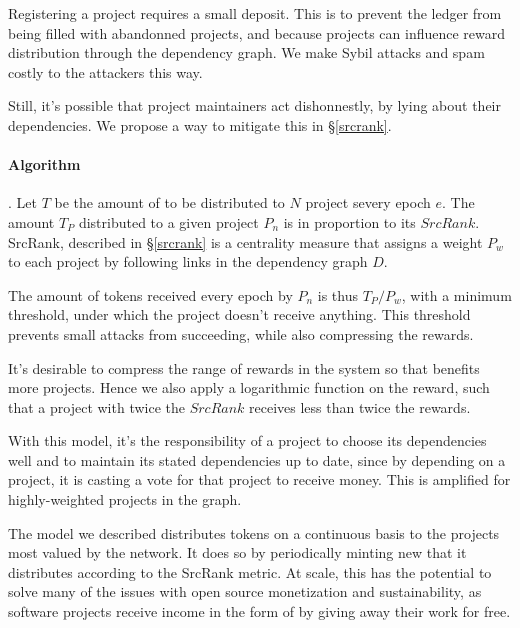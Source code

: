Registering a project requires a small deposit. This is to prevent the ledger
from being filled with abandonned projects, and because projects can influence
reward distribution through the dependency graph. We make Sybil attacks and
spam costly to the attackers this way.

Still, it's possible that project maintainers act dishonnestly, by lying about
their dependencies. We propose a way to mitigate this in \S \ref{srcrank}.

\paragraph{Algorithm}. Let $T$ be the amount of \oscoin{} to be distributed to
$N$ project severy epoch $e$. The amount $T_P$ distributed to a given project
$P_n$ is in proportion to its $SrcRank$. SrcRank, described in \S \ref{srcrank}
is a centrality measure that assigns a weight $P_w$ to each project by following
links in the dependency graph $D$.

The amount of tokens received every epoch by $P_n$ is thus $T_P / P_w$, with
a minimum threshold, under which the project doesn't receive anything. This
threshold prevents small attacks from succeeding, while also compressing the
rewards.

It's desirable to compress the range of rewards in the system so that \oscoin{}
benefits more projects. Hence we also apply a logarithmic function on the reward,
such that a project with twice the $SrcRank$ receives less than twice the rewards.

With this model, it’s the responsibility of a project to choose its
dependencies well and to maintain its stated dependencies up to date, since by
depending on a project, it is casting a vote for that project to receive money.
This is amplified for highly-weighted projects in the graph.

The model we described distributes tokens on a continuous basis to the projects
most valued by the network. It does so by periodically minting new \oscoin{}
that it distributes according to the SrcRank metric. At scale, this has the
potential to solve many of the issues with open source monetization and
sustainability, as software projects receive income in the form of \oscoin{}
by giving away their work for free.
